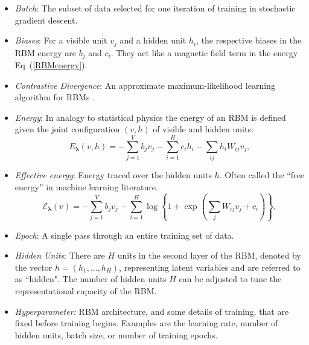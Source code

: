 \documentclass[submission, Phys]{SciPost}
\begin{document}
\begin{itemize}

	\item {\it Batch}: The subset of data selected for one iteration of training in stochastic gradient descent.

	\item {\it Biases}: For a visible unit $v_j$ and a hidden unit $h_i$, the respective biases in the RBM energy are $b_j$ and $c_i$. They act like a magnetic field term in the energy Eq~(\ref{RBMenergy}).

	\item {\it Contrastive Divergence}: An approximate maximum-likelihood learning algorithm for RBMs \cite{hinton2002training}.

	\item {\it Energy}: In analogy to statistical physics the energy of an RBM is defined given the joint configuration $(v,h)$ of visible and hidden units:
	      \begin{equation}
		      E_{\bm{\lambda}}(v,h) = - \sum\limits_{j=1}^V b_j v_j - \sum\limits_{i=1}^H c_i h_i - \sum\limits_{ij} h_i W_{ij} v_j, \label{RBMenergy}
	      \end{equation}

	\item {\it Effective energy}: Energy traced over the hidden units $h$.  Often called the ``free energy'' in machine learning literature.
	      \begin{equation}
		      \mathcal{E}_{\bm{\lambda}}(v) = - \sum\limits_{j=1}^V b_j v_j - \sum\limits_{i=1}^H \log \left\{ 1 + \exp \left( \sum\limits_{j} W_{ij}v_j +c_i\right) \right\}, \label{RBMeffectiveenergy}
	      \end{equation}

	\item {\it Epoch}: A single pass through an entire training set of data.

	\item {\it Hidden Units}: There are $H$ units in the second layer of the RBM, denoted by the vector $h=(h_1, ..., h_H)$, representing latent variables and are referred to as ``hidden". The number of hidden units $H$ can be adjusted to tune the representational capacity of the RBM.

	\item{\it Hyperparameter:} RBM architecture, and some details of training, that are fixed before training begins.  Examples are the learning rate, number of hidden units, batch size, or number of training epochs.


\end{itemize}
\end{document}
